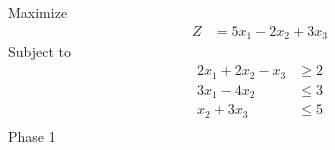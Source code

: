 \documentclass[12pt]{article}
\begin{document}
\subsection{}
Maximize
\begin{align*}
Z                   & = 5x_{1}-2x_{2}+3x_{3}
\end{align*}
Subject to
\begin{align*}
2x_{1}+2x_{2}-x_{3} & \ge 2                                                                                                                                                                                             \\
3x_{1}-4x_{2}       & \le 3                                                                                                                                                                                             \\
x_{2}+3x_{3}        & \le 5                                                                                                                                                                                             \\
\end{align*}
Phase 1                                                                                                                                                                                                                 \\[5pt]
\end{document}
